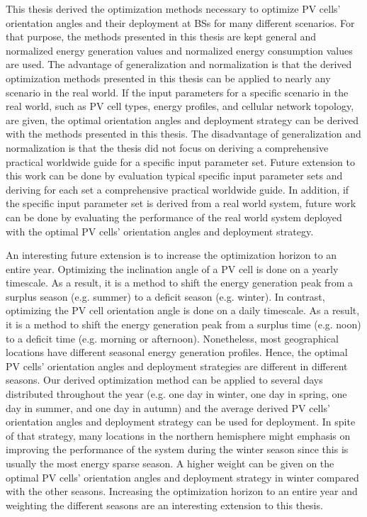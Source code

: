 This thesis derived the optimization methods necessary to optimize PV cells’ orientation angles and their deployment at BSs for many different scenarios. For that purpose, the methods presented in this thesis are kept general and normalized energy generation values and normalized energy consumption values are used. The advantage of generalization and normalization is that the derived optimization methods presented in this thesis can be applied to nearly any scenario in the real world. If the input parameters for a specific scenario in the real world, such as PV cell types, energy profiles, and cellular network topology, are given, the optimal orientation angles and deployment strategy can be derived with the methods presented in this thesis. The disadvantage of generalization and normalization is that the thesis did not focus on deriving a comprehensive practical worldwide guide for a specific input parameter set. Future extension to this work can be done by evaluation typical specific input parameter sets and deriving for each set a comprehensive practical worldwide guide. In addition, if the specific input parameter set is derived from a real world system, future work can be done by evaluating the performance of the real world system deployed with the optimal PV cells’ orientation angles and deployment strategy.

An interesting future extension is to increase the optimization horizon to an entire year. Optimizing the inclination angle of a PV cell is done on a yearly timescale. As a result, it is a method to shift the energy generation peak from a surplus season (e.g. summer) to a deficit season (e.g. winter). In contrast, optimizing the PV cell orientation angle is done on a daily timescale. As a result, it is a method to shift the energy generation peak from a surplus time (e.g. noon) to a deficit time (e.g. morning or afternoon). Nonetheless, most geographical locations have different seasonal energy generation profiles. Hence, the optimal PV cells’ orientation angles and deployment strategies are different in different seasons. Our derived optimization method can be applied to several days distributed throughout the year (e.g. one day in winter, one day in spring, one day in summer, and one day in autumn) and the average derived PV cells’ orientation angles and deployment strategy can be used for deployment. In spite of that strategy, many locations in the northern hemisphere might emphasis on improving the performance of the system during the winter season since this is usually the most energy sparse season. A higher weight can be given on the optimal PV cells’ orientation angles and deployment strategy in winter compared with the other seasons. Increasing the optimization horizon to an entire year and weighting the different seasons are an interesting extension to this thesis.

